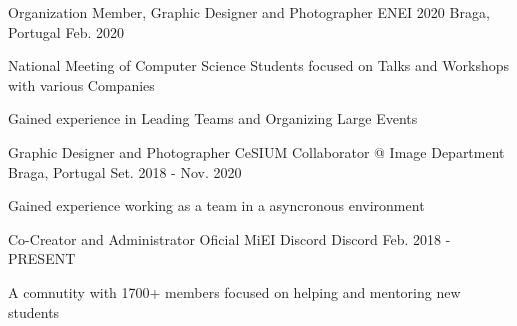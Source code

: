 


\begin{cventries}



\cventry
{Organization Member, Graphic Designer and Photographer} %
{ENEI 2020} %
{Braga, Portugal} %
{Feb. 2020} %
{ %
\begin{cvitems}
\item{National Meeting of Computer Science Students focused on Talks and
  Workshops with various Companies}
\item {Gained experience in Leading Teams and Organizing Large Events}
\end{cvitems}
}


\cventry
{Graphic Designer and Photographer} %
{CeSIUM Collaborator @ Image Department} %
{Braga, Portugal} %
{Set. 2018 - Nov. 2020} %
{ %
\begin{cvitems}
\item {Gained experience working as a team in a asyncronous environment}
\end{cvitems}
}


\cventry
{Co-Creator and Administrator} %
{Oficial MiEI Discord} %
{Discord} %
{Feb. 2018 - PRESENT} %
{ %
\begin{cvitems}
\item {A comnutity with 1700+ members focused on helping and mentoring new
  students}
\end{cvitems}
}


\end{cventries}
